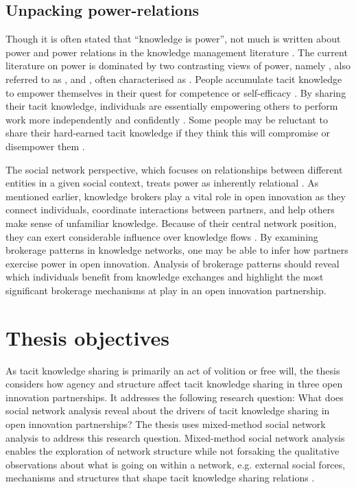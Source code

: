 \subsection{Unpacking power-relations} 

Though it is often stated that \enquote{knowledge is power}, not much is written about power and power relations in the knowledge management literature \citep{haugaard2012rethinking}. The current literature on power is dominated by two contrasting views of power, namely , also referred to as , and , often characterised as  \citep{haugaard2012rethinking}.  People accumulate tacit knowledge to empower themselves in their quest for competence or self-efficacy \citep{endres2007tacit}. By sharing their tacit knowledge, individuals are essentially empowering others to perform work more independently and confidently \citep{bordum2002tacit,lin2007share}. Some people may be reluctant to share their hard-earned tacit knowledge if they think this will compromise or disempower them \citep{schultze2004knowing,singh2019territoriality}. \medskip

The social network perspective, which focuses on relationships between different entities in a given social context, treats power as inherently relational \citep{ibarra1993power}. As mentioned earlier, knowledge brokers play a vital role in open innovation as they connect individuals, coordinate interactions between partners, and help others make sense of unfamiliar knowledge. Because of their central network position, they can exert considerable influence over knowledge flows \citep{burt1992structural}. By examining brokerage patterns in knowledge networks, one may be able to infer how partners exercise power in open innovation. Analysis of brokerage patterns should reveal which individuals benefit from knowledge exchanges and highlight the most significant brokerage mechanisms at play in an open innovation partnership. 

\section{Thesis objectives}

As tacit knowledge sharing is primarily an act of volition or free will, the thesis considers how agency and structure affect tacit knowledge sharing in three open innovation partnerships. It addresses the following research question: What does social network analysis reveal about the drivers of tacit knowledge sharing in open innovation partnerships? The thesis uses mixed-method social network analysis to address this research question. Mixed-method social network analysis enables the exploration of network structure while not forsaking the qualitative observations about what is going on within a network, e.g. external social forces, mechanisms and structures that shape tacit knowledge sharing relations \citep{crossley2010social}. \medskip

